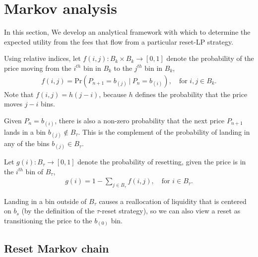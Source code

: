 \documentclass[sigconf, usenames, dvipsnames]{acmart}
\newcommand{\dcp}[1]{\textcolor{blue}{{\scriptsize{David:}}#1}}
\begin{document}
\section{Markov analysis}\label{sec:markov}

In this section, We develop an analytical framework with which to determine the expected utility from the fees that flow from a particular reset-LP strategy.


\begin{definition}\label{def:f}
Using relative indices, let $f(i,j) \colon B_{k}\times B_{k} \to [0,1]$ denote the probability of the price moving from the $i^{th}$ bin in $B_{k}$ to the $j^{th}$ bin in $B_{k}$,
\begin{align}
    f(i,j) = \mathrm{Pr}\left(P_{n+1} = b_{(j)}~|~P_n = b_{(i)}\right), \quad \text{for } i,j \in B_k.
\end{align}
Note that $f(i,j) = h(j-i)$, because $h$ defines the probability that the price moves $j-i$ bins.
\end{definition}

Given $P_n = b_{(i)}$, there is also a non-zero probability that the  next price $P_{n+1}$ lands in a bin $b_{(j)} \notin B_{\tau}$. This is the complement of the probability of landing in any of the bins $b_{(j)} \in B_{\tau}$.
%
\begin{definition}
Let $g(i) \colon B_{\tau} \to [0,1]$ denote the probability of resetting, given the price is in the $i^{th}$ bin of $B_{\tau}$,
\begin{align}
    g(i) = 1 - \sum_{j \in B_{\tau}} f(i,j), \quad \text{for } i \in B_{\tau}.
\end{align}
\end{definition}
Landing in a bin outside of $B_{\tau}$ causes a reallocation of liquidity that is centered on $b_s$ (by the definition of the $\tau$-reset strategy), so we can also view a reset as transitioning the price to  the $b_{(0)}$ bin. 

\subsection{Reset Markov chain}
\end{document}

